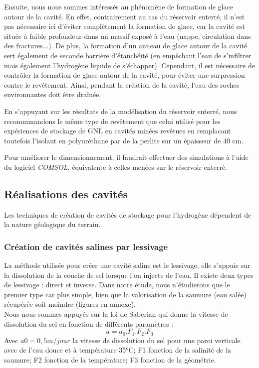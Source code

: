 \documentclass[11pt,french,a4paper]{article}
\begin{document}
Ensuite, nous nous sommes intéressés au phénomène de formation de glace autour de la cavité. En effet, contrairement au cas du réservoir enterré, il n’est pas nécessaire ici d’éviter complètement la formation de glace, car la cavité est située à faible profondeur dans un massif exposé à l'eau (nappe, circulation dans des fractures...). De plus, la formation d’un anneau de glace autour de la cavité sert également de seconde barrière d’étanchéité (en empêchant l’eau de s’infiltrer mais également l’hydrogène liquide de s’échapper). Cependant, il est nécessaire de contrôler la formation de glace autour de la cavité, pour éviter une surpression contre le revêtement. Ainsi, pendant la création de la cavité, l’eau des roches environnantes doit être draînée. 

En s'appuyant sur les résultats de la modélisation du réservoir enterré, nous recommmandons le même type de revêtement que celui utilisé pour les expériences de stockage de GNL en cavités minées revêtues en remplacant toutefois l'isolant en polyuréthane par de la perlite sur un épaisseur de 40 cm.

Pour améliorer le dimensionnement, il faudrait effectuer des simulations à l’aide du logiciel \emph{COMSOL}, équivalente à celles menées sur le réservoir enterré.\\



\subsection{Réalisations des cavités}
Les techniques de création de cavités de stockage pour l'hydrogène dépendent de la nature géologique du terrain. 

\subsubsection{Création de cavités salines par lessivage}
La méthode utilisée pour créer une cavité saline est le lessivage, elle s’appuie sur la dissolution de la couche de sel lorsque l’on injecte de l’eau. Il existe deux types de lessivage : direct et inverse. Dans notre étude, nous n’étudierons que le premier type car plus simple, bien que la valorisation de la saumure (eau salée) récupérée soit moindre (figures en annexe). \\

Nous nous sommes appuyés sur la loi de Saberian qui donne la vitesse de dissolution du sel en fonction de différents paramètres : 
$$ a = a_0 . F_1 . F_2 . F_3  $$
Avec  $a0 = 0,5 m/jour$ la vitesse de dissolution du sel pour une paroi verticale avec de l’eau douce et à température 35°C; F1 fonction de la salinité de la saumure; F2 fonction de la température; F3 fonction de la géométrie.\\
\end{document}
